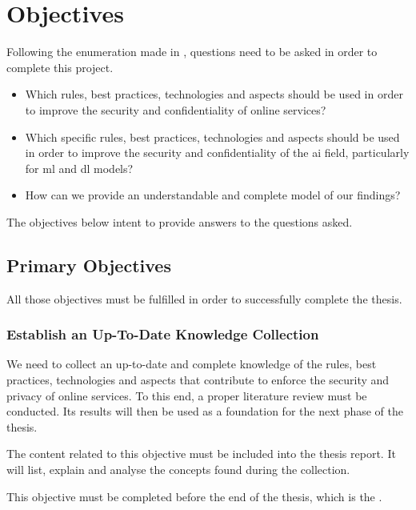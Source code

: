 \chapter{Objectives}
\label{chap:objectives}

Following the enumeration made in , questions need to be asked in order to complete this project.
\begin{itemize}
    \item Which rules, best practices, technologies and aspects should be used in order to improve the security and confidentiality of online services?
    \item Which specific rules, best practices, technologies and aspects should be used in order to improve the security and confidentiality of the \gls{ai} field, particularly for \gls{ml} and \gls{dl} models?
    \item How can we provide an understandable and complete model of our findings?
\end{itemize}

The objectives below intent to provide answers to the questions asked.

\section{Primary Objectives}
\label{sec:objectives_primary}

All those objectives must be fulfilled in order to successfully complete the thesis.

\subsection{Establish an Up-To-Date Knowledge Collection}
\label{sec:objectives_primary_knowledge}

We need to collect an up-to-date and complete knowledge of the rules, best practices, technologies and aspects that contribute to enforce the security and privacy of online services. To this end, a proper literature review must be conducted. Its results will then be used as a foundation for the next phase of the thesis.

The content related to this objective must be included into the thesis report. It will list, explain and analyse the concepts found during the collection.

This objective must be completed before the end of the thesis, which is the .

